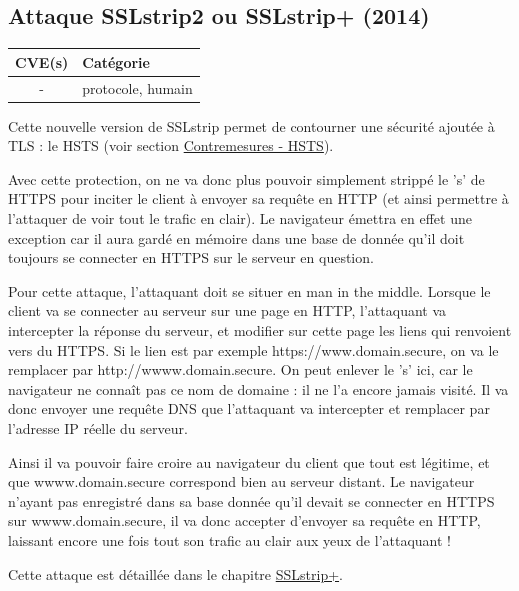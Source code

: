 \subsection{Attaque SSLstrip2 ou SSLstrip+ (2014)}

\begin{tabularx}{0.96\textwidth}{|c|X|}
  \hline
  \textbf{CVE(s)} & \textbf{Catégorie} \\
  \hline
  - & protocole, humain \\
  \hline
\end{tabularx}

\vspace{1em}

Cette nouvelle version de SSLstrip permet de contourner une sécurité ajoutée à TLS : le HSTS (voir section \hyperref[sec:hsts]{Contremesures - HSTS}).

Avec cette protection, on ne va donc plus pouvoir simplement strippé le 's' de HTTPS pour inciter le client à envoyer sa requête en HTTP (et ainsi permettre à l'attaquer de voir tout le trafic en clair). Le navigateur émettra en effet une exception car il aura gardé en mémoire dans une base de donnée qu'il doit toujours se connecter en HTTPS sur le serveur en question.

Pour cette attaque, l'attaquant doit se situer en man in the middle. Lorsque le client va se connecter au serveur sur une page en HTTP, l'attaquant va intercepter la réponse du serveur, et modifier sur cette page les liens qui renvoient vers du HTTPS. Si le lien est par exemple https://www.domain.secure, on va le remplacer par http://wwww.domain.secure. On peut enlever le 's' ici, car le navigateur ne connaît pas ce nom de domaine : il ne l'a encore jamais visité. Il va donc envoyer une requête DNS que l'attaquant va intercepter et remplacer par l'adresse IP réelle du serveur.

Ainsi il va pouvoir faire croire au navigateur du client que tout est légitime, et que wwww.domain.secure correspond bien au serveur distant. Le navigateur n'ayant pas enregistré dans sa base donnée qu'il devait se connecter en HTTPS sur wwww.domain.secure, il va donc accepter d'envoyer sa requête en HTTP, laissant encore une fois tout son trafic au clair aux yeux de l'attaquant !

Cette attaque est détaillée dans le chapitre \hyperref[sec:sslstrip2]{SSLstrip+}.


